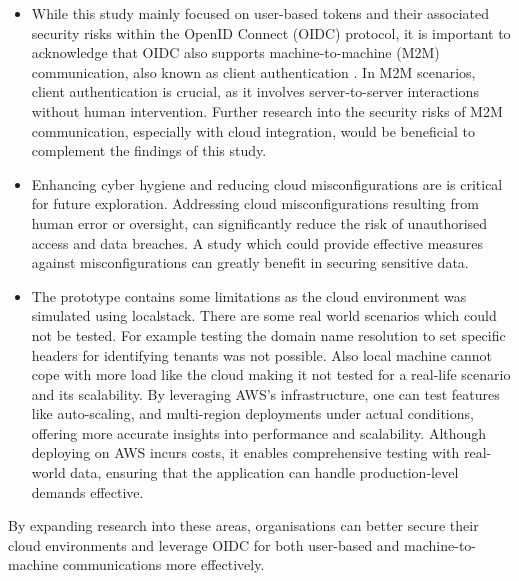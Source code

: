 \begin{itemize} 
    
    \item While this study mainly focused on user-based tokens and their associated security risks within the OpenID Connect (OIDC) protocol, it is important to acknowledge that OIDC also supports machine-to-machine (M2M) communication, also known as client authentication \citep{openid_docs}. In M2M scenarios, client authentication is crucial, as it involves server-to-server interactions without human intervention. Further research into the security risks of M2M communication, especially with cloud integration, would be beneficial to complement the findings of this study.

    \item Enhancing cyber hygiene and reducing cloud misconfigurations are is critical for future exploration. Addressing cloud misconfigurations resulting from human error or oversight, can significantly reduce the risk of unauthorised access and data breaches. A study which could provide effective measures against misconfigurations can greatly benefit in securing sensitive data.

    \item The prototype contains some limitations as the cloud environment was simulated using localstack. There are some real world scenarios which could not be tested. For example testing the domain name resolution to set specific headers for identifying tenants was not possible. Also local machine cannot cope with more load like the cloud making it not tested for a real-life scenario and its scalability. By leveraging AWS's infrastructure, one can test features like auto-scaling, and multi-region deployments under actual conditions, offering more accurate insights into performance and scalability. Although deploying on AWS incurs costs, it enables comprehensive testing with real-world data, ensuring that the application can handle production-level demands effective.
\end{itemize}






By expanding research into these areas, organisations can better secure their cloud environments and leverage OIDC for both user-based and machine-to-machine communications more effectively.


